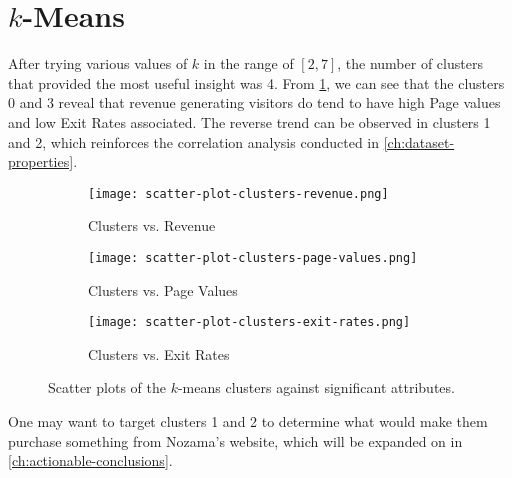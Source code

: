 \documentclass[../cmpe-251-project-report.tex]{subfiles}
\begin{document}
  \section{\(k\)-Means}
  After trying various values of \(k\) in the range of \([2,7]\), the number of clusters that provided the most useful insight was 4. From \cref{fig:scatter-plot-k-means}, we can see that the clusters 0 and 3 reveal that revenue generating visitors do tend to have high Page values and low Exit Rates associated. The reverse trend can be observed in clusters 1 and 2, which reinforces the correlation analysis conducted in \cref{ch:dataset-properties}.
  \begin{figure}
    \begin{subfigure}{0.49\textwidth}
      \texttt{[image: scatter-plot-clusters-revenue.png]}
      \caption{Clusters vs. Revenue}
    \end{subfigure}
    \begin{subfigure}{0.49\textwidth}
      \texttt{[image: scatter-plot-clusters-page-values.png]}
      \caption{Clusters vs. Page Values}
    \end{subfigure}
    \par\bigskip
    \begin{subfigure}{0.49\textwidth}
      \texttt{[image: scatter-plot-clusters-exit-rates.png]}
      \caption{Clusters vs. Exit Rates}
    \end{subfigure}
    \caption{Scatter plots of the \(k\)-means clusters against significant attributes.}
    \label{fig:scatter-plot-k-means}
  \end{figure}
  One may want to target clusters 1 and 2 to determine what would make them purchase something from Nozama's website, which will be expanded on in \cref{ch:actionable-conclusions}.
\end{document}
